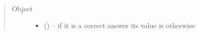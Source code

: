 \documentclass[letterpaper,10pt,english,openany,oneside]{sphinxmanual}
\begin{document}
\begin{fulllineitems}
\begin{sphinxVerbatim}[commandchars=\\\{\}]
                 
                 
        \PYG{p}{]}
  \PYG{p}{]}
\end{sphinxVerbatim}
\begin{quote}\begin{description}
\item[{Object}] \leavevmode\begin{itemize}
\item {} 
\sphinxAtStartPar
{} () – if it is a correct answer its value is  otherwise 

\end{itemize}

\end{description}\end{quote}

\end{fulllineitems}
\end{document}
